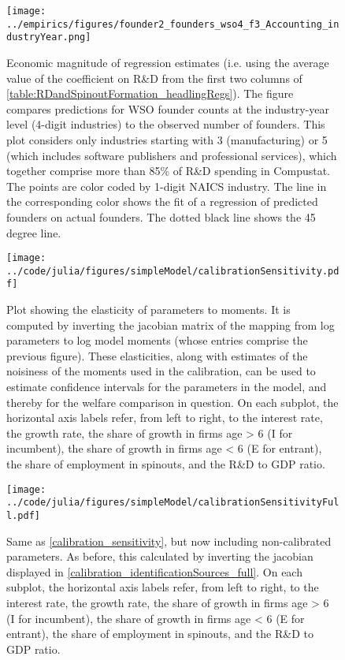 \documentclass[ecta,nameyear,final]{econsocart}
\theoremstyle{definition}
\begin{document}
\begin{figure}[]
	\centering
	\texttt{[image: ../empirics/figures/founder2\_founders\_wso4\_f3\_Accounting\_industryYear.png]}
	\caption{Economic magnitude of regression estimates (i.e. using the average value of the coefficient on R\&D from the first two columns of \autoref{table:RDandSpinoutFormation_headlingRegs}). The figure compares predictions for WSO founder counts at the industry-year level (4-digit industries) to the observed number of founders. This plot considers only industries starting with 3 (manufacturing) or 5 (which includes software publishers and professional services), which together comprise more than 85\% of R\&D spending in Compustat. The points are color coded by 1-digit NAICS industry. The line in the corresponding color shows the fit of a regression of predicted founders on actual founders. The dotted black line shows the 45 degree line.}
	\label{figure:founder2_founders_f3_Accounting_industryYear}
\end{figure}

\begin{figure}[]
	\centering
	\texttt{[image: ../code/julia/figures/simpleModel/calibrationSensitivity.pdf]}
	\caption{Plot showing the elasticity of parameters to moments. It is computed by inverting the jacobian matrix of the mapping from log parameters to log model moments (whose entries comprise the previous figure). These elasticities, along with estimates of the noisiness of the moments used in the calibration, can be used to estimate confidence intervals for the parameters in the model, and thereby for the welfare comparison in question. On each subplot, the horizontal axis labels refer, from left to right, to the interest rate, the growth rate, the share of growth in firms age > 6 (I for incumbent), the share of growth in firms age < 6 (E for entrant), the share of employment in spinouts, and the R\&D to GDP ratio.}
	\label{calibration_sensitivity}
\end{figure}

\begin{figure}[]
	\centering
	\texttt{[image: ../code/julia/figures/simpleModel/calibrationSensitivityFull.pdf]}
	\caption{Same as \autoref{calibration_sensitivity}, but now including non-calibrated parameters. As before, this calculated by inverting the jacobian displayed in \autoref{calibration_identificationSources_full}. On each subplot, the horizontal axis labels refer, from left to right, to the interest rate, the growth rate, the share of growth in firms age > 6 (I for incumbent), the share of growth in firms age < 6 (E for entrant), the share of employment in spinouts, and the R\&D to GDP ratio.}
	\label{calibration_sensitivity_full}
\end{figure}
\end{document}
